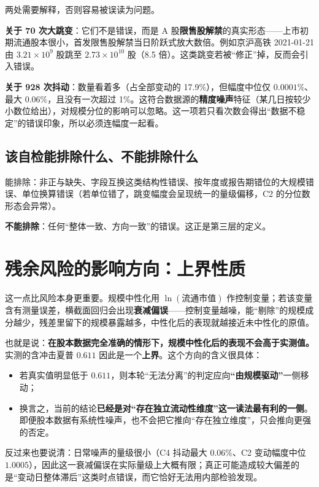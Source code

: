 \documentclass[11pt,a4paper]{ctexart}
\begin{document}
两处需要解释，否则容易被误读为问题。

\textbf{关于 70 次大跳变}：它们不是错误，而是 A 股\textbf{限售股解禁}的真实形态——上市初期流通股本很小，首发限售股解禁当日阶跃式放大数倍。例如京沪高铁 2021-01-21 由 $3.21\times10^9$ 股跳至 $2.73\times10^{10}$ 股（8.5 倍）。这类跳变若被“修正”掉，反而会引入错误。

\textbf{关于 928 次抖动}：数量看着多（占全部变动的 17.9\%），但幅度中位仅 $0.0001\%$、最大 $0.06\%$，且没有一次超过 1\%。这符合数据源的\textbf{精度噪声}特征（某几日按较少小数位给出），对规模分位的影响可以忽略。这一项若只看次数会得出“数据不稳定”的错误印象，所以必须连幅度一起看。

\subsection{该自检能排除什么、不能排除什么}

能排除：非正与缺失、字段互换这类结构性错误、按年度或报告期错位的大规模错误、单位换算错误（若单位错了，跳变幅度会呈现统一的量级偏移，C2 的分位数形态会异常）。

\textbf{不能排除}：任何“整体一致、方向一致”的错误。这正是第三层的定义。

\section{残余风险的影响方向：上界性质}

这一点比风险本身更重要。规模中性化用 $\ln(\text{流通市值})$ 作控制变量；若该变量含有测量误差，横截面回归会出现\textbf{衰减偏误}——控制变量越噪，能“剔除”的规模成分越少，残差里留下的规模暴露越多，中性化后的表现就越接近未中性化的原值。

也就是说：\textbf{在股本数据完全准确的情形下，规模中性化后的表现不会高于实测值。}实测的含冲击夏普 $0.611$ 因此是一个\textbf{上界}。这个方向的含义很具体：

\begin{itemize}
  \item 若真实值明显低于 $0.611$，则本轮“无法分离”的判定应向\textbf{“由规模驱动”}一侧移动；
  \item 换言之，当前的结论\textbf{已经是对“存在独立流动性维度”这一读法最有利的一侧}。即便股本数据有系统性噪声，也不会把它推向“存在独立维度”，只会推向更强的否定。
\end{itemize}

反过来也要说清：日常噪声的量级很小（C4 抖动最大 $0.06\%$、C2 变动幅度中位 $1.0005$），因此这一衰减偏误在实际量级上大概有限；真正可能造成较大偏差的是“变动日整体滞后”这类时点错误，而它恰好无法用内部检验发现。
\end{document}
